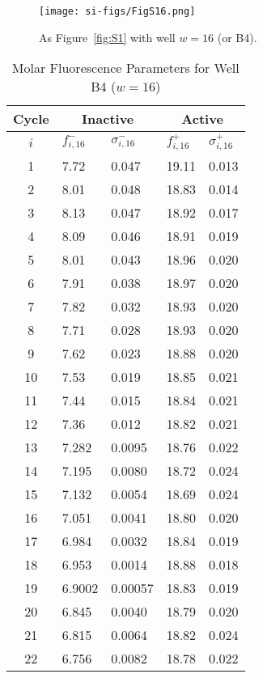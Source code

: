                 \begin{figure}
                    \centering
                    \texttt{[image: si-figs/FigS16.png]}
                    \caption{
                        As Figure~\ref{fig:S1} with well $w=16$ (or B4).
                    }
                \end{figure}
                \clearpage
    \begin{table}
        \caption{Molar Fluorescence Parameters for Well B4 ($w=16$)}
        \centering
        \begin{tabular}{c|ll|ll}
            Cycle & \multicolumn{2}{c|}{Inactive} & \multicolumn{2}{c}{Active} \\
            \hline
            $i$ & $f_{i,16}^{-}$ & $\sigma_{i,16}^{-}$ &  $f_{i,16}^{+}$ & $\sigma_{i,16}^{+}$ \\
            \hline
    1 & 7.72 & 0.047 & 19.11 & 0.013 \\
2 & 8.01 & 0.048 & 18.83 & 0.014 \\
3 & 8.13 & 0.047 & 18.92 & 0.017 \\
4 & 8.09 & 0.046 & 18.91 & 0.019 \\
5 & 8.01 & 0.043 & 18.96 & 0.020 \\
6 & 7.91 & 0.038 & 18.97 & 0.020 \\
7 & 7.82 & 0.032 & 18.93 & 0.020 \\
8 & 7.71 & 0.028 & 18.93 & 0.020 \\
9 & 7.62 & 0.023 & 18.88 & 0.020 \\
10 & 7.53 & 0.019 & 18.85 & 0.021 \\
11 & 7.44 & 0.015 & 18.84 & 0.021 \\
12 & 7.36 & 0.012 & 18.82 & 0.021 \\
13 & 7.282 & 0.0095 & 18.76 & 0.022 \\
14 & 7.195 & 0.0080 & 18.72 & 0.024 \\
15 & 7.132 & 0.0054 & 18.69 & 0.024 \\
16 & 7.051 & 0.0041 & 18.80 & 0.020 \\
17 & 6.984 & 0.0032 & 18.84 & 0.019 \\
18 & 6.953 & 0.0014 & 18.88 & 0.018 \\
19 & 6.9002 & 0.00057 & 18.83 & 0.019 \\
20 & 6.845 & 0.0040 & 18.79 & 0.020 \\
21 & 6.815 & 0.0064 & 18.82 & 0.024 \\
22 & 6.756 & 0.0082 & 18.78 & 0.022 \\

\end{tabular}
\end{table}

